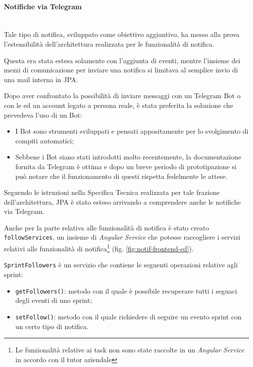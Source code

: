 \paragraph{Notifiche via Telegram} \mbox{} \\

Tale tipo di notifica, sviluppato come obiettivo aggiuntivo, ha messo alla
prova l'estensibilità dell'architettura realizzata per le funzionalità di
notifica.

Questa era stata estesa solamente con l'aggiunta di eventi, mentre l'insieme
dei mezzi di comunicazione per inviare una notifica si limitava al semplice
invio di una mail interna in JPA.

Dopo aver confrontato la possibilità di inviare messaggi con un Telegram Bot o
con le  ed un account legato a persona reale, è stata preferita la
soluzione che prevedeva l'uso di un Bot:

\begin{itemize}
\item I Bot sono strumenti sviluppati e pensati appositamente per lo
  svolgimento di compiti automatici;
\item Sebbene i Bot siano stati introdotti molto recentemente, la
  documentazione fornita da Telegram è ottima e dopo un breve periodo di
  prototipazione si può notare che il funzionamento di questi rispetta
  fedelmente le attese.
\end{itemize}

Seguendo le istruzioni nella Specifica Tecnica realizzata per tale frazione
dell'architettura, JPA è stato esteso arrivando a comprendere anche le
notifiche via Telegram.

Anche per la parte relativa alle funzionalità di notifica è stato creato 
\texttt{followServices}, un insieme di \emph{Angular Service} che potesse
raccogliere i servizi relativi alle funzionalità di notifica\footnote{Le
funzionalità relative ai task non sono state raccolte in un \emph{Angular
Service} in accordo con il tutor aziendale} (fig. \ref{fig:notif-frontend-cd}).

\texttt{SprintFollowers} è un servizio che contiene le seguenti operazioni
relative agli sprint:

\begin{itemize}
\item \texttt{getFollowers()}: metodo con il quale è possibile recuperare
  tutti i seguaci degli eventi di uno sprint;
\item \texttt{setFollow()}: metodo con il quale richiedere di seguire un
  evento sprint con un certo tipo di notifica.
\end{itemize}

